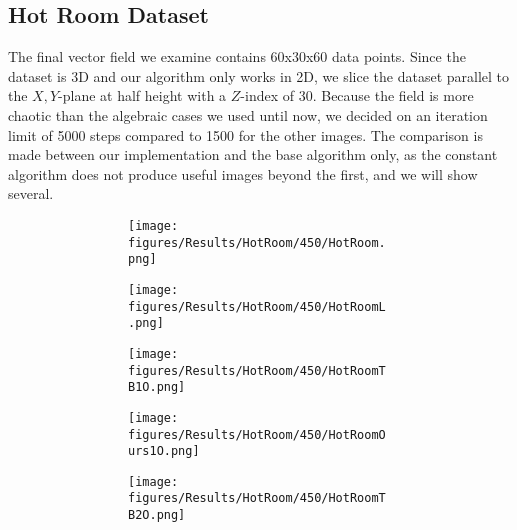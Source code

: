 \subsection{Hot Room Dataset}

The final vector field we examine contains 60x30x60 data points.
Since the dataset is 3D and our algorithm only works in 2D,
we slice the dataset parallel to the $X,Y$-plane at half height with a $Z$-index of 30.
Because the field is more chaotic than the algebraic cases we used until now,
we decided on an iteration limit of 5000 steps compared to 1500 for the other images.
The comparison is made between our implementation and the base algorithm only,
as the constant algorithm does not produce useful images beyond the first, and we will show several.

\begin{figure}[t]
    \centering
    \begin{subfigure}{\textwidth}
        \centering
        \begin{subfigure}{.49\textwidth}
            \centering
            \texttt{[image: figures/Results/HotRoom/450/HotRoom.png]}
            \caption{}
        \end{subfigure}
        \begin{subfigure}{.49\textwidth}
            \centering
            \texttt{[image: figures/Results/HotRoom/450/HotRoomL.png]}
            \caption{}
        \end{subfigure}
    \end{subfigure}
    \begin{subfigure}{\textwidth}
        \centering
        \begin{subfigure}{.49\textwidth}
            \centering
            \texttt{[image: figures/Results/HotRoom/450/HotRoomTB1O.png]}
            \caption{}
        \end{subfigure}
        \begin{subfigure}{.49\textwidth}
            \centering
            \texttt{[image: figures/Results/HotRoom/450/HotRoomOurs1O.png]}
            \caption{}
        \end{subfigure}
    \end{subfigure}
    \begin{subfigure}{\textwidth}
        \centering
        \begin{subfigure}{.49\textwidth}
            \centering
            \texttt{[image: figures/Results/HotRoom/450/HotRoomTB2O.png]}
            \caption{}

\end{subfigure}
\end{subfigure}
\end{figure}
